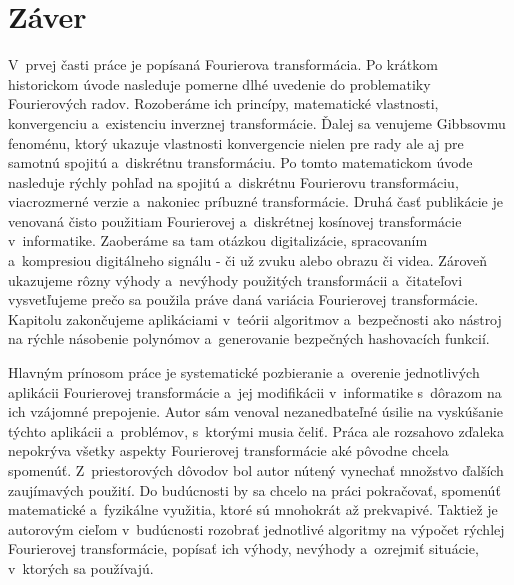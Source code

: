 \chapter{Záver}

V~prvej časti práce je popísaná Fourierova transformácia. Po krátkom
historickom úvode nasleduje pomerne dlhé uvedenie do problematiky
Fourierových radov. Rozoberáme ich princípy, matematické vlastnosti,
konvergenciu a~existenciu inverznej transformácie. Ďalej sa venujeme
Gibbsovmu fenoménu, ktorý ukazuje vlastnosti konvergencie nielen pre
rady ale aj pre samotnú spojitú a~diskrétnu transformáciu. Po tomto
matematickom úvode nasleduje rýchly pohľad na spojitú a~diskrétnu
Fourierovu transformáciu, viacrozmerné verzie a~nakoniec príbuzné
transformácie.
Druhá časť publikácie je venovaná čisto použitiam Fourierovej 
a~diskrétnej kosínovej transformácie v~informatike. Zaoberáme sa tam
otázkou digitalizácie, spracovaním a~kompresiou digitálneho signálu -
či už zvuku alebo obrazu či videa. Zároveň ukazujeme rôzny výhody 
a~nevýhody použitých transformácii a~čitateľovi vysvetľujeme prečo sa
použila práve daná variácia Fourierovej transformácie. Kapitolu
zakončujeme aplikáciami v~teórii algoritmov a~bezpečnosti ako nástroj
na rýchle násobenie polynómov a~generovanie bezpečných hashovacích
funkcií.

Hlavným prínosom práce je systematické pozbieranie a~overenie jednotlivých
aplikácii Fourierovej transformácie a~jej modifikácii v~informatike 
s~dôrazom na ich vzájomné prepojenie. Autor sám venoval nezanedbateľné
úsilie na vyskúšanie týchto aplikácii a~problémov, s~ktorými musia
čeliť. Práca ale rozsahovo zďaleka
nepokrýva všetky aspekty Fourierovej transformácie aké pôvodne chcela
spomenúť. Z~priestorových dôvodov bol autor nútený
vynechať množstvo ďalších zaujímavých použití. Do budúcnosti by sa
chcelo na práci pokračovať, spomenúť matematické a~fyzikálne využitia,
ktoré sú mnohokrát až prekvapivé. Taktiež je autorovým cieľom 
v~budúcnosti rozobrať jednotlivé algoritmy 
na výpočet rýchlej Fourierovej transformácie,
popísať ich výhody, nevýhody a~ozrejmiť situácie, v~ktorých sa
používajú.
